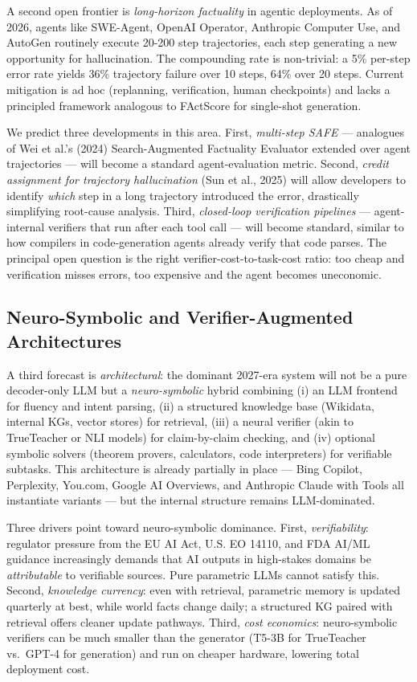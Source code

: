 A second open frontier is \emph{long-horizon factuality} in agentic deployments. As of 2026, agents like SWE-Agent, OpenAI Operator, Anthropic Computer Use, and AutoGen routinely execute 20-200 step trajectories, each step generating a new opportunity for hallucination. The compounding rate is non-trivial: a 5\% per-step error rate yields 36\% trajectory failure over 10 steps, 64\% over 20 steps. Current mitigation is ad hoc (replanning, verification, human checkpoints) and lacks a principled framework analogous to FActScore for single-shot generation.

We predict three developments in this area. First, \emph{multi-step SAFE} --- analogues of Wei et al.'s (2024) Search-Augmented Factuality Evaluator extended over agent trajectories --- will become a standard agent-evaluation metric. Second, \emph{credit assignment for trajectory hallucination} (Sun et al., 2025) will allow developers to identify \emph{which} step in a long trajectory introduced the error, drastically simplifying root-cause analysis. Third, \emph{closed-loop verification pipelines} --- agent-internal verifiers that run after each tool call --- will become standard, similar to how compilers in code-generation agents already verify that code parses. The principal open question is the right verifier-cost-to-task-cost ratio: too cheap and verification misses errors, too expensive and the agent becomes uneconomic.

\subsection{Neuro-Symbolic and Verifier-Augmented Architectures}\label{neuro-symbolic-and-verifier-augmented-architectures}

A third forecast is \emph{architectural}: the dominant 2027-era system will not be a pure decoder-only LLM but a \emph{neuro-symbolic} hybrid combining (i) an LLM frontend for fluency and intent parsing, (ii) a structured knowledge base (Wikidata, internal KGs, vector stores) for retrieval, (iii) a neural verifier (akin to TrueTeacher or NLI models) for claim-by-claim checking, and (iv) optional symbolic solvers (theorem provers, calculators, code interpreters) for verifiable subtasks. This architecture is already partially in place --- Bing Copilot, Perplexity, You.com, Google AI Overviews, and Anthropic Claude with Tools all instantiate variants --- but the internal structure remains LLM-dominated.

Three drivers point toward neuro-symbolic dominance. First, \emph{verifiability}: regulator pressure from the EU AI Act, U.S. EO 14110, and FDA AI/ML guidance increasingly demands that AI outputs in high-stakes domains be \emph{attributable} to verifiable sources. Pure parametric LLMs cannot satisfy this. Second, \emph{knowledge currency}: even with retrieval, parametric memory is updated quarterly at best, while world facts change daily; a structured KG paired with retrieval offers cleaner update pathways. Third, \emph{cost economics}: neuro-symbolic verifiers can be much smaller than the generator (T5-3B for TrueTeacher vs.~GPT-4 for generation) and run on cheaper hardware, lowering total deployment cost.

